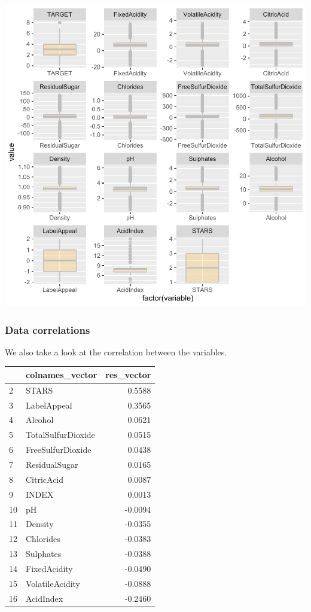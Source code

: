 \documentclass[]{elsarticle} %
\begin{document}
\begin{center}\includegraphics{paper_files/figure-latex/unnamed-chunk-7-1} \end{center}

\newpage

\hypertarget{data-correlations}{%
\subsubsection{Data correlations}\label{data-correlations}}

We also take a look at the correlation between the variables.

\begin{longtable}[]{@{}llr@{}}
\toprule
& colnames\_vector & res\_vector\tabularnewline
\midrule
\endhead
2 & STARS & 0.5588\tabularnewline
3 & LabelAppeal & 0.3565\tabularnewline
4 & Alcohol & 0.0621\tabularnewline
5 & TotalSulfurDioxide & 0.0515\tabularnewline
6 & FreeSulfurDioxide & 0.0438\tabularnewline
7 & ResidualSugar & 0.0165\tabularnewline
8 & CitricAcid & 0.0087\tabularnewline
9 & INDEX & 0.0013\tabularnewline
10 & pH & -0.0094\tabularnewline
11 & Density & -0.0355\tabularnewline
12 & Chlorides & -0.0383\tabularnewline
13 & Sulphates & -0.0388\tabularnewline
14 & FixedAcidity & -0.0490\tabularnewline
15 & VolatileAcidity & -0.0888\tabularnewline
16 & AcidIndex & -0.2460\tabularnewline
\bottomrule
\end{longtable}
\end{document}
